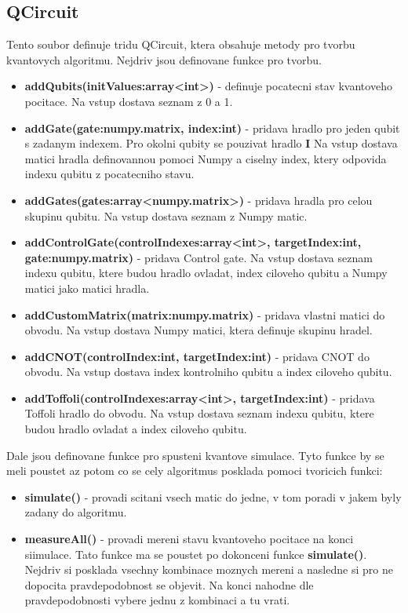 \documentclass[12pt]{article}
\begin{document}
\subsection{QCircuit}
Tento soubor definuje tridu QCircuit, ktera obsahuje metody pro tvorbu kvantovych algoritmu.
Nejdriv jsou definovane funkce pro tvorbu.
\begin{itemize}
    \item \textbf{addQubits(initValues:array<int>)} - definuje pocatecni stav kvantoveho pocitace.
          Na vstup dostava seznam z 0 a 1.
    \item \textbf{addGate(gate:numpy.matrix, index:int)} - pridava hradlo pro jeden qubit s zadanym indexem.
          Pro okolni qubity se pouzivat hradlo \textbf{I}
          Na vstup dostava matici hradla definovannou pomoci Numpy a ciselny index, ktery odpovida indexu qubitu z pocatecniho stavu.
    \item \textbf{addGates(gates:array<numpy.matrix>)} - pridava hradla pro celou skupinu qubitu.
          Na vstup dostava seznam z Numpy matic.
    \item \textbf{addControlGate(controlIndexes:array<int>, targetIndex:int, gate:numpy.matrix)} - pridava Control gate.
          Na vstup dostava seznam indexu qubitu, ktere budou hradlo ovladat, index ciloveho qubitu a Numpy matici jako matici hradla.
    \item \textbf{addCustomMatrix(matrix:numpy.matrix)} - pridava vlastni matici do obvodu.
          Na vstup dostava Numpy matici, ktera definuje skupinu hradel.
    \item \textbf{addCNOT(controlIndex:int, targetIndex:int)} - pridava CNOT do obvodu.
          Na vstup dostava index kontrolniho qubitu a index ciloveho qubitu.
    \item \textbf{addToffoli(controlIndexes:array<int>, targetIndex:int)} - pridava Toffoli hradlo do obvodu.
          Na vstup dostava seznam indexu qubitu, ktere budou hradlo ovladat a index ciloveho qubitu.
\end{itemize}
\par Dale jsou definovane funkce pro spusteni kvantove simulace.
Tyto funkce by se meli poustet az potom co se cely algoritmus posklada pomoci tvoricich funkci:
\begin{itemize}
    \item \textbf{simulate()} - provadi scitani vsech matic do jedne, v tom poradi v jakem byly zadany do algoritmu.
    \item \textbf{measureAll()} - provadi mereni stavu kvantoveho pocitace na konci siimulace.
          Tato funkce ma se poustet po dokonceni funkce \textbf{simulate()}.
          Nejdriv si posklada vsechny kombinace moznych mereni a nasledne si pro ne dopocita pravdepodobnost se objevit.
          Na konci nahodne dle pravdepodobnosti vybere jednu z kombinaci a tu vrati.
\end{itemize}
\end{document}
